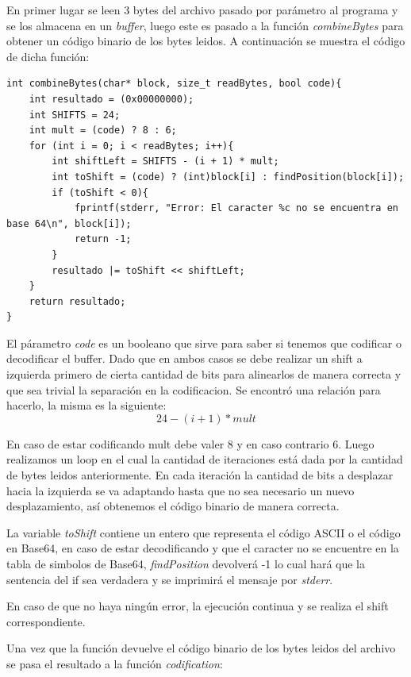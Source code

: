 \documentclass[titlepage,a4paper]{article}
\begin{document}
En primer lugar se leen 3 bytes del archivo pasado por parámetro al programa y se los almacena en un \textit{buffer}, luego este es pasado a la función \textit{combineBytes} para obtener un código binario de los bytes leidos. A continuación se muestra el código de dicha función:

\begin{lstlisting}[style=customC]
int combineBytes(char* block, size_t readBytes, bool code){
	int resultado = (0x00000000);
	int SHIFTS = 24;
	int mult = (code) ? 8 : 6;
	for (int i = 0; i < readBytes; i++){
		int shiftLeft = SHIFTS - (i + 1) * mult;
		int toShift = (code) ? (int)block[i] : findPosition(block[i]);
		if (toShift < 0){
			fprintf(stderr, "Error: El caracter %c no se encuentra en base 64\n", block[i]);
			return -1;
		}
		resultado |= toShift << shiftLeft;
	}
	return resultado;
}
\end{lstlisting}

El párametro \textit{code} es un booleano que sirve para saber si tenemos que codificar o decodificar el buffer. Dado que en ambos casos se debe realizar un shift a izquierda primero de cierta cantidad de bits para alinearlos de manera correcta y que sea trivial la separación en la codificacion. Se encontró una relación para hacerlo, la misma es la siguiente: $$ 24 - (i + 1) * mult $$

En caso de estar codificando mult debe valer 8 y en caso contrario 6. Luego realizamos un loop en el cual la cantidad de iteraciones está dada por la cantidad de bytes leidos anteriormente. En cada iteración la cantidad de bits a desplazar hacia la izquierda se va adaptando hasta que no sea necesario un nuevo desplazamiento, así obtenemos el código binario de manera correcta. \newline

La variable \textit{toShift} contiene un entero que representa el código ASCII o el código en Base64, en caso de estar decodificando y que el caracter no se encuentre en la tabla de simbolos de Base64, \textit{findPosition} devolverá -1 lo cual hará que la sentencia del if sea verdadera y se imprimirá el mensaje por \textit{stderr}.\newline

En caso de que no haya ningún error, la ejecución continua y se realiza el shift correspondiente. \newline

Una vez que la función devuelve el código binario de los bytes leidos del archivo se pasa el resultado a la función \textit{codification}:
\end{document}
